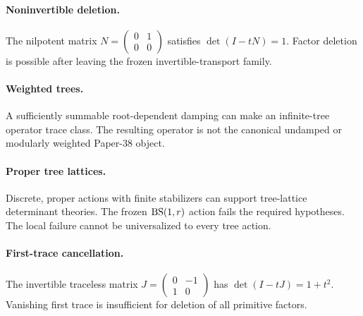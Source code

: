 \paragraph{Noninvertible deletion.}
The nilpotent matrix
$N=\left(\begin{smallmatrix}0&1\\0&0\end{smallmatrix}\right)$ satisfies
$\det(I-tN)=1$.  Factor deletion is possible after leaving the frozen
invertible-transport family.

\paragraph{Weighted trees.}
A sufficiently summable root-dependent damping can make an infinite-tree
operator trace class.  The resulting operator is not the canonical undamped
or modularly weighted Paper-38 object.

\paragraph{Proper tree lattices.}
Discrete, proper actions with finite stabilizers can support tree-lattice
determinant theories.  The frozen $\operatorname{BS}(1,r)$ action fails the required
hypotheses.  The local failure cannot be universalized to every tree action.

\paragraph{First-trace cancellation.}
The invertible traceless matrix
$J=\left(\begin{smallmatrix}0&-1\\1&0\end{smallmatrix}\right)$ has
$\det(I-tJ)=1+t^2$.  Vanishing first trace is insufficient for deletion of all
primitive factors.
